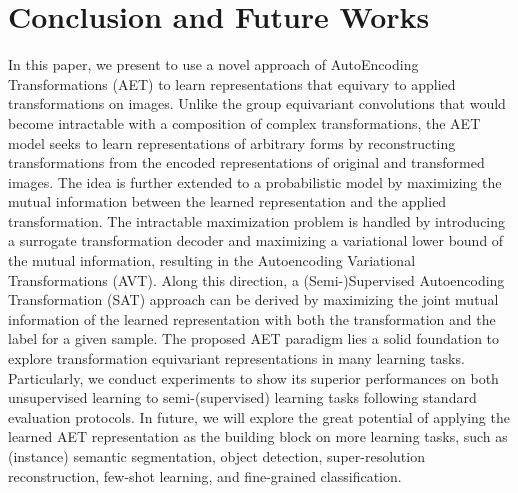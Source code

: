 \documentclass[10pt,journal,compsoc,twoside]{IEEEtran}
\begin{document}



\section{Conclusion and Future Works}\label{sec:concl}
In this paper, we present to use a novel approach of AutoEncoding Transformations (AET) to learn representations that equivary to applied transformations on images. Unlike the group equivariant convolutions that would become intractable with a composition of complex transformations, the AET model seeks to learn representations of arbitrary forms by reconstructing transformations from the encoded representations of original and transformed images. The idea is further extended to a probabilistic model by  maximizing the mutual information between the learned representation and the applied transformation. The intractable maximization problem is handled by introducing a surrogate transformation decoder and maximizing a variational lower bound of the mutual information, resulting in the Autoencoding Variational Transformations (AVT). Along this direction, a (Semi-)Supervised Autoencoding Transformation (SAT) approach can be derived by maximizing the joint mutual information of the learned representation with both the transformation and the label for a given sample. The proposed AET paradigm lies a solid foundation to explore transformation equivariant representations in many learning tasks. Particularly, we conduct experiments to show its superior performances on both unsupervised learning to semi-(supervised) learning tasks following standard evaluation protocols. In future, we will explore the great potential of applying the learned AET representation as the building block on more learning tasks, such as (instance) semantic segmentation, object detection, super-resolution reconstruction, few-shot learning, and fine-grained classification.





\end{document}
